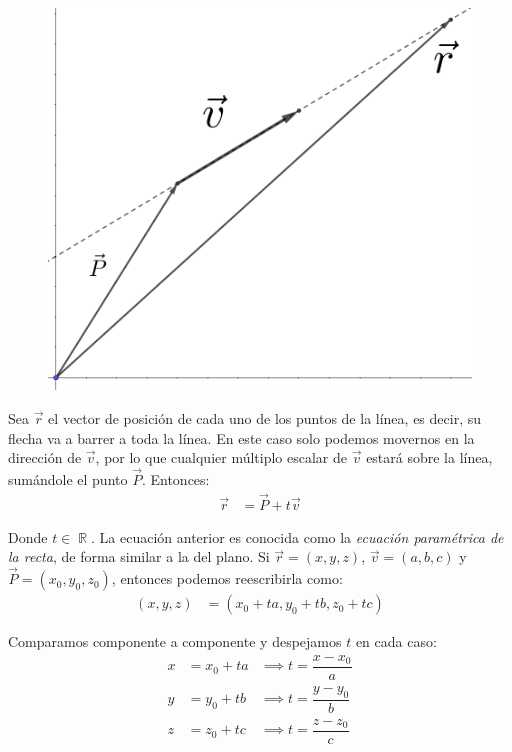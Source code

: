\documentclass[12pt, fleqn]{report}                             %
\theoremstyle{break}                                            %
\DeclareMathOperator \Reals        {\mathbb{R}}                 %
\begin{document}
            \begin{figure}[H]
                \centering
                \includegraphics[scale=1.2]{line.png}
            \end{figure}
        
            Sea $\vec{r}$ el vector de posición de cada uno de los puntos de la línea, es decir, su flecha va a barrer a toda la línea. En este caso solo podemos movernos en la dirección de $\vec{v}$, por lo que cualquier múltiplo escalar de $\vec{v}$ estará sobre la línea, sumándole el punto $\vec{P}$. Entonces:
            \begin{align}
                \vec{r} &= \vec{P} + t\vec{v} \label{lineEquationGeneral}
            \end{align}
            
            Donde $t \in \Reals$. La ecuación anterior es conocida como la \emph{ecuación paramétrica de la recta}, de forma similar a la del plano. Si $\vec{r}=(x,y,z)$, $\vec{v}=(a,b,c)$ y $\vec{P}=(x_0,y_0,z_0)$, entonces podemos reescribirla como:
            \begin{align*}
                (x, y, z) &= (x_0 + ta, y_0 + tb, z_0 + tc)
            \end{align*}
            
            Comparamos componente a componente y despejamos $t$ en cada caso:
            \begin{align*}
                x &= x_0 + ta &\implies t = \dfrac{x - x_0}{a} \\
                y &= y_0 + tb &\implies t = \dfrac{y - y_0}{b} \\
                z &= z_0 + tc &\implies t = \dfrac{z - z_0}{c}
            \end{align*}
            
\end{document}
